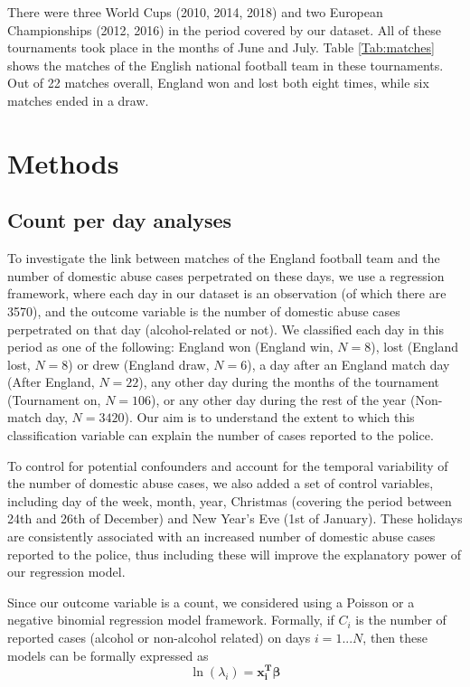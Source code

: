 \documentclass[12pt, a4paper]{article}
\newcommand{\vect}[1]{\boldsymbol{#1}}
\begin{document}
 There were three World Cups (2010, 2014, 2018) and two European Championships (2012, 2016) in the period covered by our dataset. All of these tournaments took place in the months of June and July. 
Table \ref{Tab:matches} shows the matches of the English national football team in these tournaments. Out of 22 matches overall, England won and lost both eight times, while six matches ended in a draw. 

\section{Methods}

\subsection{Count per day analyses} 
\label{modelsexplained}


To investigate the link between matches of the England football team and the number of domestic abuse cases perpetrated on these days, we use a regression framework, where each day in our dataset is an observation (of which there are 3570), and the outcome variable is the number of domestic abuse cases perpetrated on that day (alcohol-related or not). We classified each day in this period as one of the following: England won (England win, $N = 8$), lost (England lost, $N = 8$) or drew (England draw, $N = 6$), a day after an England match day (After England, $N = 22$), any other day during the months of the tournament (Tournament on, $N = 106$), or any other day during the rest of the year (Non-match day, $N = 3420$). Our aim is to understand the extent to which this classification variable can explain the number of cases reported to the police.

To control for potential confounders and account for the temporal variability of the number of domestic abuse cases, we also added a set of control variables, including day of the week, month, year, Christmas (covering the period between 24th and 26th of December) and New Year's Eve (1st of January). These holidays are consistently associated with an increased number of domestic abuse cases reported to the police, thus including these will improve the explanatory power of our regression model.

Since our outcome variable is a count, we considered using a Poisson or a negative binomial regression model framework. Formally, if $C_i$ is the number of reported cases (alcohol or non-alcohol related) on days $i = 1...N$, then these models can be formally expressed as
%
\begin{equation}
 \ln(\lambda_i) =\vect{x_i^{T}}\vect{\beta}
\end{equation}
\end{document}

